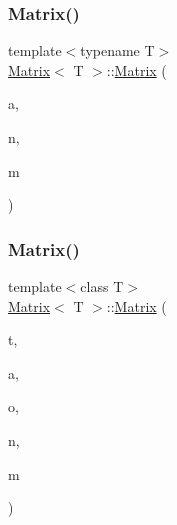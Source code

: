 \mbox{\label{classMatrix_a697e01f8d46c2059d0420d5b420efb91}} 
\subsubsection{\texorpdfstring{Matrix()}{Matrix()}\hspace{0.1cm}{\footnotesize\ttfamily [3/7]}}
{\footnotesize\ttfamily template$<$typename T$>$ \\
\mbox{\hyperlink{classMatrix}{Matrix}}$<$ T $>$\+::\mbox{\hyperlink{classMatrix}{Matrix}} (\begin{DoxyParamCaption}\item[{const T \&}]{a,  }\item[{const unsigned int}]{n,  }\item[{const unsigned int}]{m }\end{DoxyParamCaption})}

\mbox{\label{classMatrix_a991881e660607b10ff4fbf705006108d}} 
\subsubsection{\texorpdfstring{Matrix()}{Matrix()}\hspace{0.1cm}{\footnotesize\ttfamily [4/7]}}
{\footnotesize\ttfamily template$<$class T$>$ \\
\mbox{\hyperlink{classMatrix}{Matrix}}$<$ T $>$\+::\mbox{\hyperlink{classMatrix}{Matrix}} (\begin{DoxyParamCaption}\item[{\mbox{\hyperlink{Array_8h_afb4b79601b9f07458ff37d2c507b3e6d}{M\+Type}}}]{t,  }\item[{const T \&}]{a,  }\item[{const T \&}]{o,  }\item[{const unsigned int}]{n,  }\item[{const unsigned int}]{m }\end{DoxyParamCaption})}

\mbox{\label{classMatrix_ab2f0cdfc1e7aac9ddd46a1c6b6a3f2f9}} 
